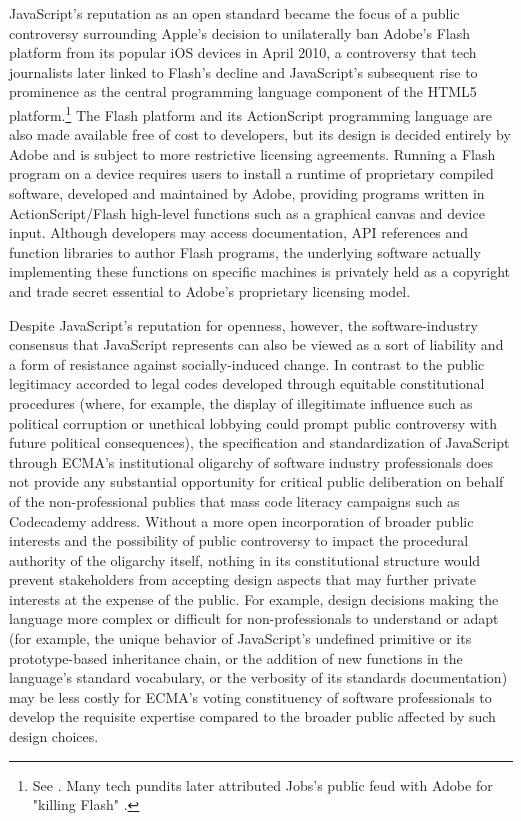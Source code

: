JavaScript's reputation as an open standard became the focus of a public controversy surrounding Apple's decision to unilaterally ban Adobe's Flash platform from its popular iOS devices in April 2010, a controversy that tech journalists later linked to Flash's decline and JavaScript's subsequent rise to prominence as the central programming language component of the HTML5 platform.\footnote{
  See \autocite{Jobs2010}. Many tech pundits later attributed Jobs's public feud with Adobe for "killing Flash" \autocites[e.g.,][]{Manjoo10}{Isaac2011}{Lawler12}.
}
The Flash platform and its ActionScript programming language are also made available free of cost to developers, but its design is decided entirely by Adobe and is subject to more restrictive licensing agreements. Running a Flash program on a device requires users to install a runtime of proprietary compiled software, developed and maintained by Adobe, providing programs written in ActionScript/Flash high-level functions such as a graphical canvas and device input. Although developers may access documentation, API references and function libraries to author Flash programs, the underlying software actually implementing these functions on specific machines is privately held as a copyright and trade secret essential to Adobe's proprietary licensing model.

Despite JavaScript's reputation for openness, however, the software-industry consensus that JavaScript represents can also be viewed as a sort of liability and a form of resistance against socially-induced change. In contrast to the public legitimacy accorded to legal codes developed through equitable constitutional procedures (where, for example, the display of illegitimate influence such as political corruption or unethical lobbying could prompt public controversy with future political consequences), the specification and standardization of JavaScript through ECMA's institutional oligarchy of software industry professionals does not provide any substantial opportunity for critical public deliberation on behalf of the non-professional publics that mass code literacy campaigns such as Codecademy address. Without a more open incorporation of broader public interests and the possibility of public controversy to impact the procedural authority of the oligarchy itself, nothing in its constitutional structure would prevent stakeholders from accepting design aspects that may further private interests at the expense of the public. For example, design decisions making the language more complex or difficult for non-professionals to understand or adapt (for example, the unique behavior of JavaScript's undefined primitive or its prototype-based inheritance chain, or the addition of new functions in the language's standard vocabulary, or the verbosity of its standards documentation) may be less costly for ECMA's voting constituency of software professionals to develop the requisite expertise compared to the broader public affected by such design choices.

